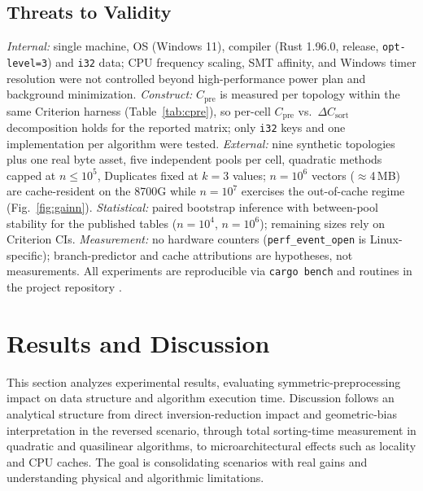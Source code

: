\documentclass[namedate,webpdf,contemporary,large]{TBench-template}%
\theoremstyle{thmstyleone}%
\theoremstyle{thmstyletwo}%
\theoremstyle{thmstylethree}%
\begin{document}
\subsection{Threats to Validity}
\emph{Internal:} single machine, OS (Windows 11), compiler (Rust 1.96.0, release, \texttt{opt-level=3}) and \texttt{i32} data; CPU frequency scaling, SMT affinity, and Windows timer resolution were not controlled beyond high-performance power plan and background minimization. \emph{Construct:} $C_{\text{pre}}$ is measured per topology within the same Criterion harness (Table~\ref{tab:cpre}), so per-cell $C_{\text{pre}}$ vs.\ $\Delta C_{\text{sort}}$ decomposition holds for the reported matrix; only \texttt{i32} keys and one implementation per algorithm were tested. \emph{External:} nine synthetic topologies plus one real byte asset, five independent pools per cell, quadratic methods capped at $n\le10^5$, Duplicates fixed at $k{=}3$ values; $n{=}10^6$ vectors ($\approx$4\,MB) are cache-resident on the 8700G while $n{=}10^7$ exercises the out-of-cache regime (Fig.~\ref{fig:gainn}). \emph{Statistical:} paired bootstrap inference with between-pool stability for the published tables ($n{=}10^4$, $n{=}10^6$); remaining sizes rely on Criterion CIs. \emph{Measurement:} no hardware counters (\texttt{perf\_event\_open} is Linux-specific); branch-predictor and cache attributions are hypotheses, not measurements. All experiments are reproducible via \texttt{cargo bench} and routines in the project repository \cite{anonymous_repository_2026}.

\section{Results and Discussion}\label{sec:results}
This section analyzes experimental results, evaluating symmetric-preprocessing impact on data structure and algorithm execution time. Discussion follows an analytical structure from direct inversion-reduction impact and geometric-bias interpretation in the reversed scenario, through total sorting-time measurement in quadratic and quasilinear algorithms, to microarchitectural effects such as locality and CPU caches. The goal is consolidating scenarios with real gains and understanding physical and algorithmic limitations.
\end{document}
